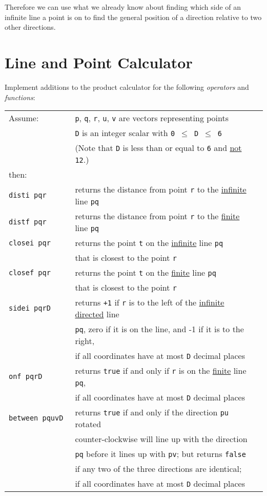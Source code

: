 \documentclass[12pt]{article}
\begin{document}
Therefore we can use what we already know about finding which side
of an infinite line a point is on
to find the general position of a direction relative to
two other directions.

\newpage

\section{Line and Point Calculator}
Implement additions to the product calculator for
the following {\em operators} and {\em functions}:
\begin{center}
\begin{tabular}{l@{~~~~}l@{~~~~}l}
Assume: & {\tt p}, {\tt q}, {\tt r}, {\tt u}, {\tt v}
          are vectors representing points \\
	& {\tt D} is an integer scalar with {\tt 0 $\leq$ D $\leq$ 6} \\
	& (Note that {\tt D} is less than or equal to {\tt 6} and
	  \underline{not} {\tt 12}.) \\
then: \\[1ex]
\tt disti~pqr  & returns the distance from point {\tt r} to the
		\underline{infinite} line {\tt pq} \\
\tt distf~pqr  & returns the distance from point {\tt r} to the
		\underline{finite} line {\tt pq} \\
\tt closei~pqr  & returns the point {\tt t} on the \underline{infinite}
                  line {\tt pq} \\
		& that is closest to the point {\tt r} \\
\tt closef~pqr  & returns the point {\tt t} on the \underline{finite}
                  line {\tt pq} \\
		& that is closest to the point {\tt r} \\
\tt sidei~pqrD & returns {\tt +1} if {\tt r} is to the left of the
                \underline{infinite directed} line \\
	      & {\tt pq}, zero if it is on the line,
	        and -1 if it is to the right, \\
	      & if all coordinates have at most {\tt D} decimal places \\
\tt onf~pqrD & returns {\tt true} if and only if {\tt r} is on the
                \underline{finite} line {\tt pq}, \\
	      & if all coordinates have at most {\tt D} decimal places \\
\tt between~pquvD & returns {\tt true} if and only if the direction
                   {\tt pu} rotated \\
		 & counter-clockwise will line up with the direction \\
		 & {\tt pq} before it lines up with {\tt pv}; but returns
		   {\tt false} \\
		 & if any two of the three directions are identical; \\
	      & if all coordinates have at most {\tt D} decimal places \\
\end{tabular}
\end{center}
\end{document}
